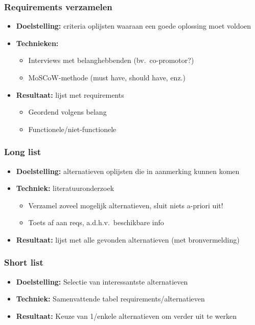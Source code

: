 \documentclass[aspectratio=169]{beamer}
\begin{document}
\begin{frame}
  \frametitle{Requirements verzamelen}

  \begin{itemize}
    \item \textbf{Doelstelling:} criteria oplijsten waaraan een goede oplossing moet voldoen
    \item \textbf{Technieken:}
      \begin{itemize}
        \item Interviews met belanghebbenden (bv.\ co-promotor?)
        \item MoSCoW-methode (must have, should have, enz.)
      \end{itemize}
    \item \textbf{Resultaat:} lijst met requirements
      \begin{itemize}
        \item Geordend volgens belang
        \item Functionele/niet-functionele
      \end{itemize}
  \end{itemize}

\end{frame}

\begin{frame}
  \frametitle{Long list}

  \begin{itemize}
    \item \textbf{Doelstelling:} alternatieven oplijsten die in aanmerking kunnen komen
    \item \textbf{Techniek:} literatuuronderzoek
      \begin{itemize}
        \item Verzamel zoveel mogelijk alternatieven, sluit niets a-priori uit!
        \item Toets af aan reqs, a.d.h.v.\ beschikbare info
      \end{itemize}
    \item \textbf{Resultaat:} lijst met alle gevonden alternatieven (met bronvermelding)
  \end{itemize}

\end{frame}

\begin{frame}
  \frametitle{Short list}

  \begin{itemize}
    \item \textbf{Doelstelling:} Selectie van interessantste alternatieven
    \item \textbf{Techniek:} Samenvattende tabel requirements/alternatieven
    \item \textbf{Resultaat:} Keuze van 1/enkele alternatieven om verder uit te werken
  \end{itemize}

\end{frame}
\end{document}
